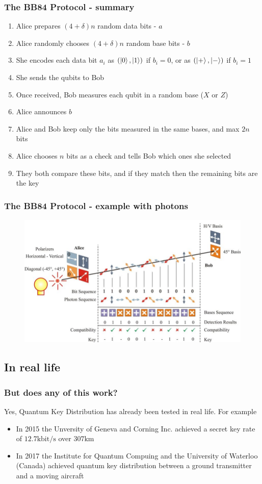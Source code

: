 \documentclass{beamer}
\begin{document}
  \begin{frame}
    \frametitle{The BB84 Protocol - summary}
    \begin{enumerate}
      \item Alice prepares $(4 + \delta)n$ random data bits - $a$
      \item Alice randomly chooses $(4 + \delta)n$ random base bits - $b$
      \item She encodes each data bit $a_i$ as $(\ket0, \ket1)$ if $b_i = 0$, or as $(\ket+, \ket-)$ if $b_i = 1$
      \item She sends the qubits to Bob
      \item Once received, Bob measures each qubit in a random base ($X$ or $Z$)
      \item Alice announces $b$
      \item Alice and Bob keep only the bits measured in the same bases, and max $2n$ bits
      \item Alice chooses $n$ bits as a check and tells Bob which ones she selected
      \item They both compare these bits, and if they match then the remaining bits are the key
    \end{enumerate}  
  \end{frame}

  \begin{frame}
    \frametitle{The BB84 Protocol - example with photons}
    \begin{figure}[H]
      \centering
      \includegraphics[width=0.8\linewidth]{bb84-photons.jpeg}
    \end{figure}
  \end{frame}

  \subsection{In real life}
  \begin{frame}
    \frametitle{But does any of this work?}
    Yes, Quantum Key Distribution has already been tested in real life.
    For example
    \begin{itemize}
      \item In 2015 the Unversity of Geneva and Corning Inc. achieved a secret key
            rate of $12.7 \mathrm{kbit/s}$ over $307 \mathrm{km}$ \cite{qkd}
      \item In 2017 the Institute for Quantum Compuing and the University of Waterloo (Canada) achieved
            quantum key distribution between a ground transmitter and a moving aircraft \cite{airborne}
    \end{itemize}
  \end{frame}
\end{document}
